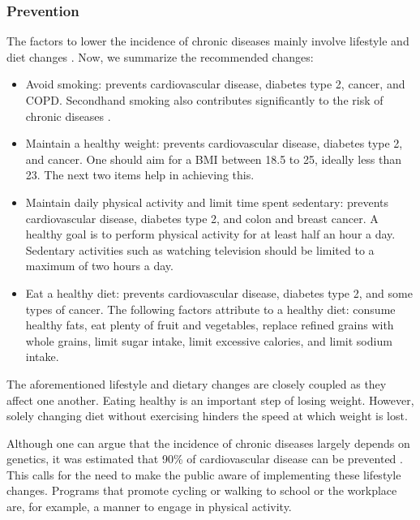         \subsubsection{Prevention}

        The factors to lower the incidence of chronic diseases mainly involve lifestyle and diet changes \cite{willett2006prevention}. Now, we summarize the recommended changes:
            \begin{itemize}
                \item Avoid smoking: prevents cardiovascular disease, diabetes type 2, cancer, and COPD. Secondhand smoking also contributes significantly to the risk of chronic diseases \cite{us2006health}.
                \item Maintain a healthy weight: prevents cardiovascular disease, diabetes type 2, and cancer. One should aim for a BMI between 18.5 to 25, ideally less than 23. The next two items help in achieving this.
                \item Maintain daily physical activity and limit time spent sedentary: prevents cardiovascular disease, diabetes type 2, and colon and breast cancer. A healthy goal is to perform physical activity for at least half an hour a day. Sedentary activities such as watching television should be limited to a maximum of two hours a day.
                \item Eat a healthy diet: prevents cardiovascular disease, diabetes type 2, and some types of cancer. The following factors attribute to a healthy diet: consume healthy fats, eat plenty of fruit and vegetables, replace refined grains with whole grains, limit sugar intake, limit excessive calories, and limit sodium intake.
            \end{itemize}

        \noindent The aforementioned lifestyle and dietary changes are closely coupled as they affect one another. Eating healthy is an important step of losing weight. However, solely changing diet without exercising hinders the speed at which weight is lost. 

        Although one can argue that the incidence of chronic diseases largely depends on genetics, it was estimated that 90\% of cardiovascular disease can be prevented \cite{mcgill2008preventing}. This calls for the need to make the public aware of implementing these lifestyle changes. Programs that promote cycling or walking to school or the workplace are, for example, a manner to engage in physical activity.

